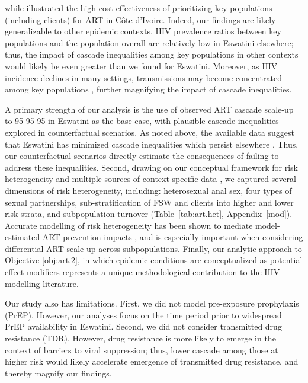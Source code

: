 while \citet{Maheu-Giroux2019cost} illustrated the high cost-effectiveness of
prioritizing key populations (including clients) for ART in C\^{o}te d’Ivoire.
Indeed, our findings are likely generalizable to other epidemic contexts.
HIV prevalence ratios between key populations and the population overall
are relatively low in Eswatini \vs elsewhere;
thus, the impact of cascade inequalities among key populations in other contexts
would likely be even greater than we found for Eswatini.
Moreover, as HIV incidence declines in many settings,
transmissions may become concentrated among key populations \cite{Brown2019},
further magnifying the impact of cascade inequalities.
\par
A primary strength of our analysis is the use of
observed ART cascade scale-up to 95-95-95 in Eswatini as the base case,
with plausible cascade inequalities explored in counterfactual scenarios.
As noted above, the available data suggest that Eswatini has
minimized cascade inequalities which persist elsewhere \cite{Hakim2018}.
Thus, our counterfactual scenarios directly estimate
the consequences of failing to address these inequalities.
Second, drawing on our conceptual framework for risk heterogeneity \cite[Table~1]{Knight2022sr}
and multiple sources of context-specific data
\cite{SDHS2006,SHIMS1,SHIMS2,Baral2014,EswKP2014,EswIBBS2022},
we captured several dimensions of risk heterogeneity, including:
heterosexual anal sex,
four types of sexual partnerships,
sub-stratification of FSW and clients into higher and lower risk strata,
and subpopulation turnover
(Table~\ref{tab:art.het}, Appendix~\ref{mod}).
Accurate modelling of risk heterogeneity
has been shown to mediate model-estimated ART prevention impacts \cite{Hontelez2013},
and is especially important when considering differential ART scale-up across subpopulations.
Finally, our analytic approach to Objective \ref{obj:art.2},
in which epidemic conditions are conceptualized as potential effect modifiers
represents a unique methodological contribution to the HIV modelling literature.
\par
Our study also has limitations.
First, we did not model pre-exposure prophylaxis (PrEP).
However, our analyses focus on the time period
prior to widespread PrEP availability in Eswatini.
Second, we did not consider transmitted drug resistance (TDR).
However, drug resistance is more likely to emerge
in the context of barriers to viral suppression;
thus, lower cascade among those at higher risk
would likely accelerate emergence of transmitted drug resistance,
and thereby magnify our findings.
